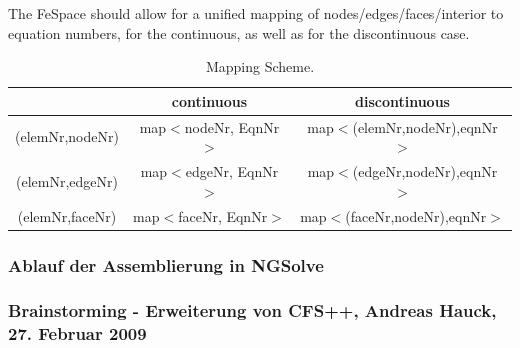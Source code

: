The FeSpace should allow for a unified mapping of nodes/edges/faces/interior to equation numbers, for the continuous, as well as for the discontinuous case.

\begin{table}[tb]
\centering
\begin{minipage}{18cc}\caption{Mapping Scheme.}
\label{tab:mapping_scheme}
\end{minipage}
\par\medskip\noindent
\begin{tabular}{c|c|c}
& continuous & discontinuous \\ \hline
(elemNr,nodeNr) & map$<$nodeNr, EqnNr$>$ & map$<$(elemNr,nodeNr),eqnNr$>$ \\
(elemNr,edgeNr) & map$<$edgeNr, EqnNr$>$ & map$<$(edgeNr,nodeNr),eqnNr$>$ \\
(elemNr,faceNr) & map$<$faceNr, EqnNr$>$ & map$<$(faceNr,nodeNr),eqnNr$>$ \\
\end{tabular}
\end{table}

\subsubsection{Ablauf der Assemblierung in NGSolve}



\subsubsection{Brainstorming - Erweiterung von CFS++, Andreas Hauck, 27. Februar 2009}

